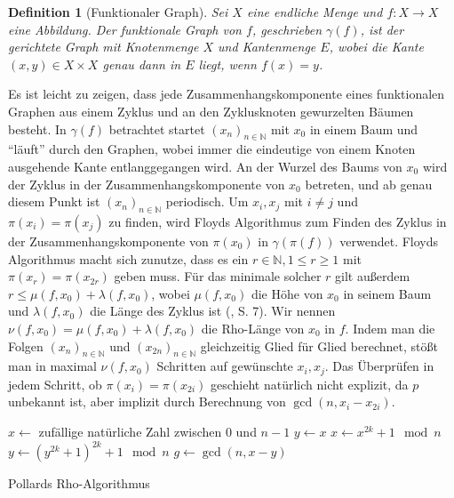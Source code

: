 \documentclass[a4paper, 10pt, ngerman]{article}
\newcommand{\N}{\mathbb{N}}
\newtheorem{definition}{Definition}
\begin{document}
\begin{definition}[Funktionaler Graph]
    Sei $X$ eine endliche Menge und $f: X \to X$ eine Abbildung. Der funktionale Graph von $f$, geschrieben $\gamma(f)$, ist der gerichtete Graph mit Knotenmenge $X$ und Kantenmenge $E$, wobei die Kante $(x, y) \in X \times X$ genau dann in $E$ liegt, wenn $f(x) = y$.
\end{definition}

\noindent Es ist leicht zu zeigen, dass jede Zusammenhangskomponente eines funktionalen Graphen aus einem Zyklus und an den Zyklusknoten gewurzelten Bäumen besteht. In $\gamma(f)$ betrachtet startet $(x_n)_{n \in \N}$ mit $x_0$ in einem Baum und "`läuft"' durch den Graphen, wobei immer die eindeutige von einem Knoten ausgehende Kante entlanggegangen wird. An der Wurzel des Baums von $x_0$ wird der Zyklus in der Zusammenhangskomponente von $x_0$ betreten, und ab genau diesem Punkt ist $(x_n)_{n \in \N}$ periodisch. Um $x_i, x_j$ mit $i \ne j$ und $\pi(x_i) = \pi(x_j)$ zu finden, wird Floyds Algorithmus zum Finden des Zyklus in der Zusammenhangskomponente von $\pi(x_0)$ in $\gamma(\pi(f))$ verwendet. Floyds Algorithmus macht sich zunutze, dass es ein $r \in \N, 1 \le r \ge 1$ mit $\pi(x_r) = \pi(x_{2r})$ geben muss. Für das minimale solcher $r$ gilt außerdem $r \le \mu(f, x_0) + \lambda(f, x_0)$, wobei $\mu(f, x_0)$ die Höhe von $x_0$ in seinem Baum und $\lambda(f, x_0)$ die Länge des Zyklus ist (\cite{knu98}, S. 7). Wir nennen $\nu(f, x_0) = \mu(f, x_0) + \lambda(f, x_0)$ die Rho-Länge von $x_0$ in $f$. Indem man die Folgen $(x_n)_{n \in \N}$ und $(x_{2n})_{n \in \N}$ gleichzeitig Glied für Glied berechnet, stößt man in maximal $\nu(f, x_0)$ Schritten auf gewünschte $x_i, x_j$. Das Überprüfen in jedem Schritt, ob $\pi(x_i) = \pi(x_{2i})$ geschieht natürlich nicht explizit, da $p$ unbekannt ist, aber implizit durch Berechnung von $\gcd(n, x_i - x_{2i})$.

\begin{algorithm*}
    $x \gets $ zufällige natürliche Zahl zwischen $0$ und $n - 1$ \;
    $y \gets x$ \;
    {
        $x \gets x^{2k} + 1 \mod n$ \;
        $y \gets (y^{2k} + 1)^{2k} + 1 \mod n$ \;
        $g \gets \gcd(n, x - y)$ \;
        {
             \;
        }
    }

    \caption{Pollards Rho-Algorithmus}
\end{algorithm*}
\end{document}
